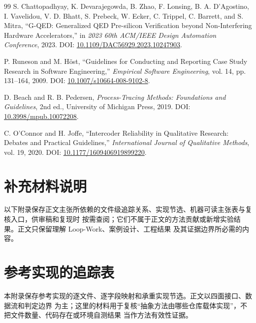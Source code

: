 \documentclass[UTF8,a4paper,zihao=-4,oneside]{ctexart}
\begin{document}
\begin{thebibliography}{99}
S. Chattopadhyay, K. Devarajegowda, B. Zhao, F. Lonsing, B. A. D'Agostino,
I. Vavelidou, V. D. Bhatt, S. Prebeck, W. Ecker, C. Trippel, C. Barrett, and S. Mitra,
``G-QED: Generalized QED Pre-silicon Verification beyond Non-Interfering Hardware
Accelerators,'' in \emph{2023 60th ACM/IEEE Design Automation Conference}, 2023.
DOI: \href{https://doi.org/10.1109/DAC56929.2023.10247903}{10.1109/DAC56929.2023.10247903}.

P. Runeson and M. H\"ost,
``Guidelines for Conducting and Reporting Case Study Research in Software Engineering,''
\emph{Empirical Software Engineering}, vol. 14, pp. 131--164, 2009.
DOI: \href{https://doi.org/10.1007/s10664-008-9102-8}{10.1007/s10664-008-9102-8}.

D. Beach and R. B. Pedersen,
\emph{Process-Tracing Methods: Foundations and Guidelines}, 2nd ed.,
University of Michigan Press, 2019.
DOI: \href{https://doi.org/10.3998/mpub.10072208}{10.3998/mpub.10072208}.

C. O'Connor and H. Joffe,
``Intercoder Reliability in Qualitative Research: Debates and Practical Guidelines,''
\emph{International Journal of Qualitative Methods}, vol. 19, 2020.
DOI: \href{https://doi.org/10.1177/1609406919899220}{10.1177/1609406919899220}.

\end{thebibliography}
\endgroup

\appendix

\section*{补充材料说明}

以下附录保存正文主张所依赖的文件级追踪关系、实现节选、机器可读主张表与复核入口，供审稿和复现时
按需查阅；它们不属于正文的方法贡献或新增实验结果。正文只保留理解 Loop-Work、案例设计、工程结果
及其证据边界所必需的内容。

\section{参考实现的追踪表}

本附录保存参考实现的逐文件、逐字段映射和承重实现节选。正文以四面接口、数据流和判定边界
为主；这里的材料用于复核“抽象方法由哪些仓库载体实现”，不把文件数量、代码存在或环境自测结果
当作方法有效性证据。

\TableMethodImplementationMap
\TableAgentFlowCommands
\TableKnowledgeCompilation
\TableRtlContractFields
\TableSkillEndToEndBinding
\TableExecutionBackendArtifacts
\TableAgentSystemGroups
\end{document}
